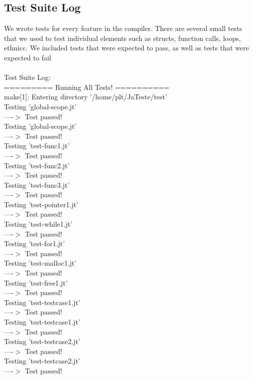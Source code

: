 \documentclass{article}
\begin{document}
\subsection{Test Suite Log}
We wrote tests for every feature in the compiler. There are several small tests that we used to test individual elements such as structs, function calls, loops, ethnicc. We included tests that were expected to pass, as well as tests that were expected to fail\\
\\
Test Suite Log:\\
========= Running All Tests! ==========\\
make[1]: Entering directory '/home/plt/JaTeste/test'\\
Testing 'global-scope.jt'\\
  ----$>$  Test passed!\\
Testing 'global-scope.jt'\\
  ----$>$  Test passed!\\
Testing 'test-func1.jt'\\
  ----$>$  Test passed!\\
Testing 'test-func2.jt'\\
  ----$>$  Test passed!\\
Testing 'test-func3.jt'\\
  ----$>$  Test passed!\\
Testing 'test-pointer1.jt'\\
  ----$>$  Test passed!\\
Testing 'test-while1.jt'\\
  ----$>$  Test passed!\\
Testing 'test-for1.jt'\\
  ----$>$  Test passed!\\
Testing 'test-malloc1.jt'\\
  ----$>$  Test passed!\\
Testing 'test-free1.jt'\\
  ----$>$  Test passed!\\
Testing 'test-testcase1.jt'\\
  ----$>$  Test passed!\\
Testing 'test-testcase1.jt'\\
  ----$>$  Test passed!\\
Testing 'test-testcase2.jt'\\
  ----$>$  Test passed!\\
Testing 'test-testcase2.jt'\\
  ----$>$  Test passed!\\
\end{document}
